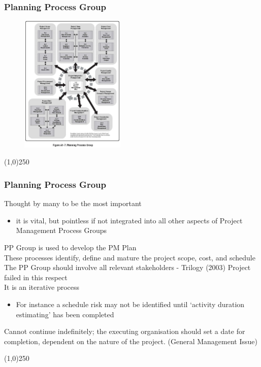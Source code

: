 \begin{frame}
\frametitle{Planning Process Group}
 \begin{figure}
 	\centering
 		\includegraphics[width = 5cm]{images/FigA1-7.jpg}
 	\label{fig:A1-7}
 \end{figure}
\end{frame}
\begin{center}\line(1,0){250}\end{center}



\begin{frame}
\frametitle{Planning Process Group}
Thought by many to be the most important\\
\begin{itemize}
	\item it is vital, but pointless if not integrated into all other aspects of Project Management Process Groups
\end{itemize}
PP Group is used to develop the PM Plan\\
These processes identify, define and mature the project scope, cost, and schedule\\
The PP Group should involve all relevant stakeholders - Trilogy (2003) Project failed in this respect\\
It is an iterative process\\
\begin{itemize}
	\item For instance a schedule risk may not be identified until `activity duration estimating' has been completed
\end{itemize}
Cannot continue indefinitely; the executing organisation should set a date for completion, dependent on the nature of the project. (General Management Issue)\\
\end{frame}
\begin{center}\line(1,0){250}\end{center}



